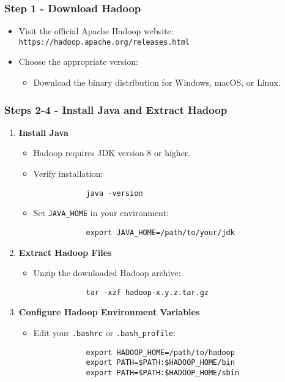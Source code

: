 \documentclass{beamer}
\begin{document}
\begin{frame}[fragile]
    \frametitle{Step 1 - Download Hadoop}
    \begin{itemize}
        \item Visit the official Apache Hadoop website: 
        \texttt{https://hadoop.apache.org/releases.html}
        \item Choose the appropriate version:
        \begin{itemize}
            \item Download the binary distribution for Windows, macOS, or Linux.
        \end{itemize}
    \end{itemize}
\end{frame}

\begin{frame}[fragile]
    \frametitle{Steps 2-4 - Install Java and Extract Hadoop}
    \begin{enumerate}
        \item \textbf{Install Java}
        \begin{itemize}
            \item Hadoop requires JDK version 8 or higher.
            \item Verify installation:
            \begin{lstlisting}
            java -version
            \end{lstlisting}
            \item Set \texttt{JAVA\_HOME} in your environment:
            \begin{lstlisting}
            export JAVA_HOME=/path/to/your/jdk
            \end{lstlisting}
        \end{itemize}
        
        \item \textbf{Extract Hadoop Files}
        \begin{itemize}
            \item Unzip the downloaded Hadoop archive:
            \begin{lstlisting}
            tar -xzf hadoop-x.y.z.tar.gz
            \end{lstlisting}
        \end{itemize}
        
        \item \textbf{Configure Hadoop Environment Variables}
        \begin{itemize}
            \item Edit your \texttt{.bashrc} or \texttt{.bash\_profile}:
            \begin{lstlisting}
            export HADOOP_HOME=/path/to/hadoop
            export PATH=$PATH:$HADOOP_HOME/bin
            export PATH=$PATH:$HADOOP_HOME/sbin
            \end{lstlisting}
        \end{itemize}
    \end{enumerate}
\end{frame}
\end{document}
